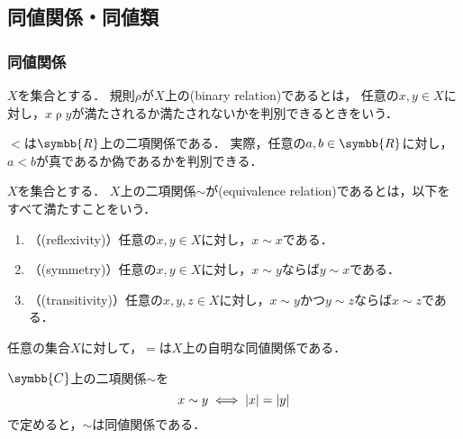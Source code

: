 \documentclass[../sotsu.tex]{subfiles}
\begin{document}
\subsection{同値関係・同値類}

\subsubsection{同値関係}

\begin{definition}[二項関係]
    \label{dfn:binary-relation}
    $X$を集合とする．
    規則$\mathbin{\rho}$が$X$上の(binary relation)であるとは，
    任意の$x, y \in X$に対し，$x \mathbin{\rho} y$が満たされるか満たされないかを判別できるときをいう．
\end{definition}

\begin{example}
    $<$は$\symbb{R}$上の二項関係である．
    実際，任意の$a, b \in \symbb{R}$に対し，$a<b$が真であるか偽であるかを判別できる．
\end{example}


\begin{definition}[同値関係]
    \label{dfn:equivalence-relation}
    $X$を集合とする．
    $X$上の二項関係$\sim$が(equivalence relation)であるとは，以下をすべて満たすことをいう．
    \begin{enumerate}
        \item （(reflexivity)）任意の$x, y \in X$に対し，$x \sim x$である．
        \item （(symmetry)）任意の$x, y \in X$に対し，$x \sim y$ならば$y \sim x$である．
        \item （(transitivity)）任意の$x, y, z \in X$に対し，$x \sim y$かつ$y \sim z$ならば$x \sim z$である．
    \end{enumerate}
\end{definition}

\begin{example}
    任意の集合$X$に対して，$=$は$X$上の自明な同値関係である．
\end{example}

\begin{example}
    $\symbb{C}$上の二項関係$\sim$を
    \begin{equation*}
        x \sim y  \iff  \lvert x\rvert = \lvert y\rvert
    \end{equation*}
    で定めると，$\sim$は同値関係である．
\end{example}
\end{document}
